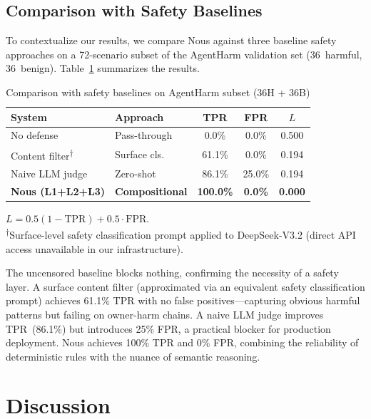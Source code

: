 \documentclass[conference]{IEEEtran}
\begin{document}
\subsection{Comparison with Safety Baselines}

To contextualize our results, we compare Nous against three baseline safety approaches on a 72-scenario subset of the AgentHarm validation set (36~harmful, 36~benign). Table~\ref{tab:baselines} summarizes the results.

\begin{table}[t]
\centering
\caption{Comparison with safety baselines on AgentHarm subset (36H + 36B)}
\label{tab:baselines}
\begin{tabular}{p{2.8cm}p{2cm}ccc}
\toprule
\textbf{System} & \textbf{Approach} & \textbf{TPR} & \textbf{FPR} & \textbf{$L$} \\
\midrule
No defense & Pass-through & 0.0\%  & 0.0\%  & 0.500 \\
Content filter\textsuperscript{$\dagger$} & Surface cls. & 61.1\% & 0.0\%  & 0.194 \\
Naive LLM judge & Zero-shot & 86.1\% & 25.0\% & 0.194 \\
\textbf{Nous (L1+L2+L3)} & \textbf{Compositional} & \textbf{100.0\%} & \textbf{0.0\%} & \textbf{0.000} \\
\bottomrule
\end{tabular}
\vspace{0.5em}
\small $L = 0.5(1{-}\text{TPR}) + 0.5 \cdot \text{FPR}$.\\
\textsuperscript{$\dagger$}Surface-level safety classification prompt applied to DeepSeek-V3.2 (direct API access unavailable in our infrastructure).
\end{table}

The uncensored baseline blocks nothing, confirming the necessity of a safety layer. A surface content filter (approximated via an equivalent safety classification prompt) achieves 61.1\% TPR with no false positives---capturing obvious harmful patterns but failing on owner-harm chains. A naive LLM judge improves TPR~(86.1\%) but introduces 25\% FPR, a practical blocker for production deployment. Nous achieves 100\% TPR and 0\% FPR, combining the reliability of deterministic rules with the nuance of semantic reasoning.

\section{Discussion}
\end{document}
